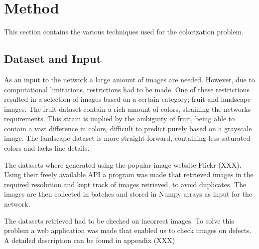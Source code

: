 \section{Method}
%
%
%
%

This section contains the various techniques used for the colorization problem. %
\subsection{Dataset and Input}

As an input to the network a large amount of images are needed. However, due to computational limitations, restrictions had to be made. One of these restrictions resulted in a selection of images based on a certain category; fruit and landscape images. The fruit dataset contain a rich amount of colors, straining the networks requirements. This strain is implied by the ambiguity %
of fruit, being able to contain a vast difference in colors, difficult to predict purely based on a grayscale image. The landscape dataset is more straight forward, containing less saturated colors and lacks fine details.

The datasets where generated using the popular image website Flickr (XXX). Using their freely available API a program was made that retrieved images in the required resolution and kept track of images retrieved, to avoid duplicates. The images are then collected in batches and stored in Numpy arrays as input for the network. %

The datasets retrieved had to be checked on incorrect images. To solve this problem a web application was made that enabled us to check images on defects. A detailed description can be found in appendix (XXX)

